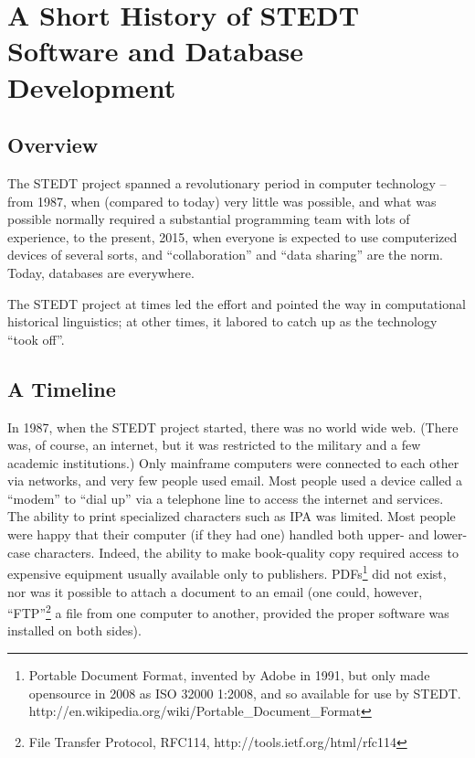 \vspace{0.25em}

\renewcommand{\thefootnote}{\arabic{footnote}}
\setcounter{footnote}{0}

\chapter*{A Short History of STEDT Software and Database Development}

\section{Overview}

The STEDT project spanned a revolutionary period in computer
technology -- from 1987, when (compared to today) very little was possible, and what was
possible normally required a substantial programming team with lots of
experience, to the present, 2015, when everyone is expected to use
computerized devices of several sorts, and  ``collaboration'' and ``data
sharing'' are the norm. Today, databases are everywhere.

The STEDT project at times led the effort and pointed the way in
computational historical linguistics; at other times, it labored to
catch up as the technology ``took off''.

\section{A Timeline}

In 1987, when the STEDT project started, there was no world
wide web. (There was, of course, an internet, but it was restricted to
the military and a few academic institutions.) Only mainframe
computers were connected to each other via networks, and very few
people used email.  Most people used a device called a ``modem'' to ``dial up'' via a
telephone line to access the internet and services. The ability to print specialized characters such as IPA was
limited. Most people were happy that their computer (if they had one)
handled both upper- and lower-case characters.  
Indeed, the ability to make book-quality copy required access to
expensive equipment usually available only to
publishers. PDFs\footnote{Portable Document Format, invented by Adobe
in 1991, but only made opensource in 2008 as ISO 32000 1:2008, and  
so available for use by STEDT. http://en.wikipedia.org/wiki/Portable\_Document\_Format} did not exist, 
nor was it possible to attach a document to an email (one
could, however, ``FTP''\footnote{File Transfer Protocol, RFC114, http://tools.ietf.org/html/rfc114} a file 
from one computer to another, provided the proper software was installed on both sides).

